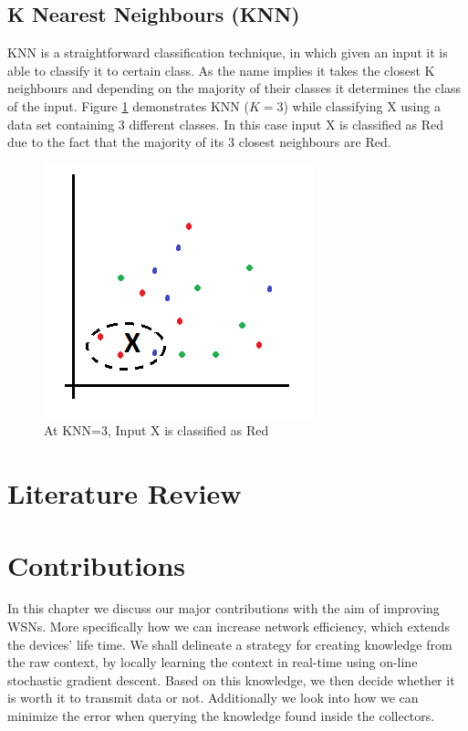 \documentclass{mproj}
\begin{document}
\section{K Nearest Neighbours (KNN)}
\label{sec:knnExplanation}
KNN \cite{knn} is a straightforward classification technique, in which given an input it is able to classify it to certain class. As the name implies it takes the closest K neighbours and depending on the majority of their classes it determines the class of the input. Figure \ref{fig:knn} demonstrates KNN ($K=3$) while classifying X using a data set containing 3 different classes. In this case input X is classified as Red due to the fact that the majority of its 3 closest neighbours are Red.
\begin{figure}[H]
\caption{At KNN=3, Input X is classified as Red}
\label{fig:knn}
\centerline{\includegraphics[scale=1]{knn}}
\end{figure}

\chapter{Literature Review}

\chapter{Contributions}
In this chapter we discuss our major contributions with the aim of improving WSNs. More specifically how we can increase network efficiency, which extends the devices' life time. We shall delineate a strategy for creating knowledge from the raw context, by locally learning the context in real-time using on-line stochastic gradient descent. Based on this knowledge, we then decide whether it is worth it to transmit data or not.
Additionally we look into how we can minimize the error when querying the knowledge found inside the collectors.
\end{document}
